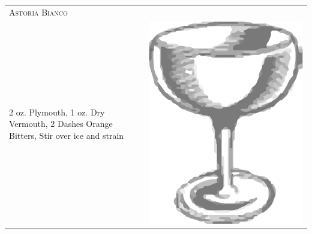 \documentclass{article}
\begin{document}
\begin{tabular}{p{2in} p{0.5in}}
\multicolumn{2}{p{3in}}{\centering\Huge\textsc{Astoria Bianco}}\\ 
  \vspace{-0.1in}2 oz. Plymouth, 1 oz. Dry Vermouth, 2 Dashes Orange Bitters, Stir over ice and strain &
  \vspace{-0.1in} \includegraphics{egg_coupe.png}
\end{tabular}
\end{document}
